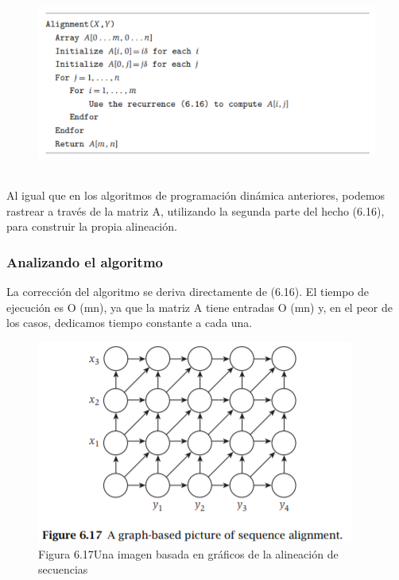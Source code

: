 \documentclass[a4paper]{article}
\begin{document}
\begin{figure}[h]
\centering
\includegraphics[scale=1]{Imagenes-Seccion6/cod6_13.PNG}
\end{figure}\\

Al igual que en los algoritmos de programación dinámica anteriores, podemos rastrear a través de la matriz A, utilizando la segunda parte del hecho (6.16), para construir la propia alineación.\\

\subsubsection*{Analizando el algoritmo}

La corrección del algoritmo se deriva directamente de (6.16). El tiempo de ejecución es O (mn), ya que la matriz A tiene entradas O (mn) y, en el peor de los casos, dedicamos tiempo constante a cada una.\\

\begin{figure}[h]
\centering
\includegraphics[scale=1]{Imagenes-Seccion6/fig6_17.PNG}
\caption{Figura 6.17Una imagen basada en gráficos de la alineación de secuencias}
\end{figure}
\end{document}
